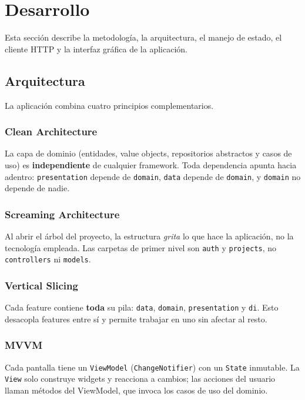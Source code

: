 \documentclass[12pt, a4paper]{article} %
\begin{document}
\section{Desarrollo}
\label{sec:desarrollo}
Esta sección describe la metodología, la arquitectura, el manejo de
estado, el cliente HTTP y la interfaz gráfica de la aplicación.

\subsection{Arquitectura}
\label{sec:arquitectura}
La aplicación combina cuatro principios complementarios.

\subsubsection{Clean Architecture}
La capa de dominio (entidades, value objects, repositorios abstractos y
casos de uso) es \textbf{independiente} de cualquier framework. Toda
dependencia apunta hacia adentro: \texttt{presentation} depende de
\texttt{domain}, \texttt{data} depende de \texttt{domain}, y
\texttt{domain} no depende de nadie.

\subsubsection{Screaming Architecture}
Al abrir el árbol del proyecto, la estructura \textit{grita} lo que hace
la aplicación, no la tecnología empleada. Las carpetas de primer nivel
son \texttt{auth} y \texttt{projects}, no \texttt{controllers} ni
\texttt{models}.

\subsubsection{Vertical Slicing}
Cada feature contiene \textbf{toda} su pila: \texttt{data},
\texttt{domain}, \texttt{presentation} y \texttt{di}. Esto desacopla
features entre sí y permite trabajar en uno sin afectar al resto.

\subsubsection{MVVM}
Cada pantalla tiene un \texttt{ViewModel} (\texttt{ChangeNotifier}) con
un \texttt{State} inmutable. La \texttt{View} solo construye widgets y
reacciona a cambios; las acciones del usuario llaman métodos del
ViewModel, que invoca los casos de uso del dominio.
\end{document}
